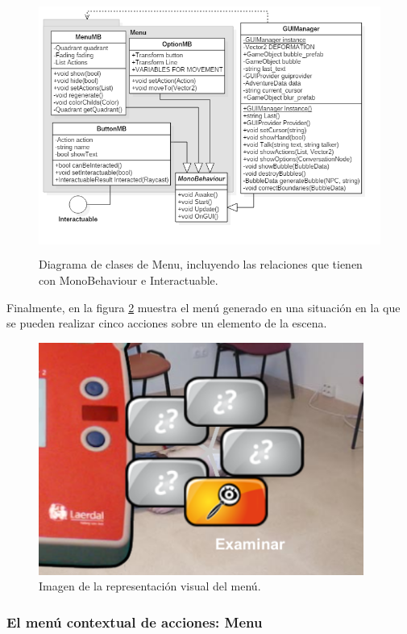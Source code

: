 \begin{figure}[h!]
	\centerline{\includegraphics[height=3.3in]{figures/it2/Menu.png}}
	\caption[Menu - Versión Final]{Diagrama de clases de Menu, incluyendo las relaciones que tienen con MonoBehaviour e Interactuable.}
	\label{menuit2}
\end{figure}

Finalmente, en la figura \ref{menuvisualit2} muestra el menú generado en una situación en la que se pueden realizar cinco acciones sobre un elemento de la escena. 

\begin{figure}[h!]
	\centerline{\includegraphics[height=3in]{figures/it2/apearance/menu.png}}
	\caption[Visual Menu - Versión Final]{Imagen de la representación visual del menú.}
	\label{menuvisualit2}
\end{figure}

\subsubsection{El menú contextual de acciones: Menu}

